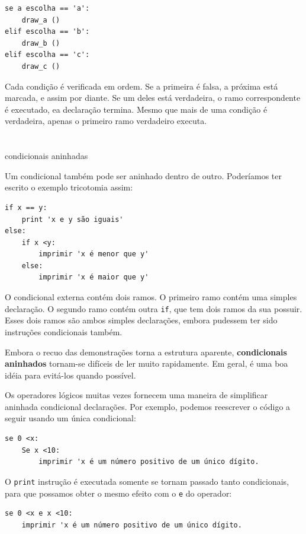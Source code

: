 \documentclass[10pt]{book}
\begin{document}
{\begin{verbatim}
se a escolha == 'a':
    draw_a ()
elif escolha == 'b':
    draw_b ()
elif escolha == 'c':
    draw_c ()
\end{verbatim}
%
Cada condição é verificada em ordem. Se a primeira é falsa,
a próxima está marcada, e assim por diante. Se um deles está
verdadeira, o ramo correspondente é executado, ea declaração
termina. Mesmo que mais de uma condição é verdadeira, apenas o
primeiro ramo verdadeiro executa.  


\section{} condicionais aninhadas

Um condicional também pode ser aninhado dentro de outro. Poderíamos ter
escrito o exemplo tricotomia assim:

\begin{verbatim}
if x == y:
    print 'x e y são iguais'
else:
    if x <y:
        imprimir 'x é menor que y'
    else:
        imprimir 'x é maior que y'
\end{verbatim}
%
O condicional externa contém dois ramos. O
primeiro ramo contém uma simples declaração. O segundo ramo
contém outra {\tt if}, que tem dois ramos da sua
possuir. Esses dois ramos são ambos simples declarações,
embora pudessem ter sido instruções condicionais também.

Embora o recuo das demonstrações torna a estrutura
aparente, {\bf condicionais aninhados} tornam-se difíceis de ler muito
rapidamente. Em geral, é uma boa idéia para evitá-los quando possível.

Os operadores lógicos muitas vezes fornecem uma maneira de simplificar aninhada condicional
declarações. Por exemplo, podemos reescrever o código a seguir usando um
única condicional:

\begin{verbatim}
se 0 <x:
    Se x <10:
        imprimir 'x é um número positivo de um único dígito.
\end{verbatim}
%
O {\tt print} instrução é executada somente se tornam passado tanto
condicionais, para que possamos obter o mesmo efeito com o {\tt e} do operador:

\begin{verbatim}
se 0 <x e x <10:
    imprimir 'x é um número positivo de um único dígito.
\end{verbatim}


}
\end{document}
